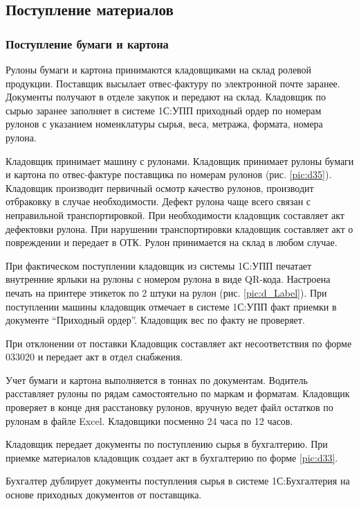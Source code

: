 \newpage
\subsection{Поступление материалов}
\label{bp:MatInput}
%


\subsubsection{Поступление бумаги и картона}

Рулоны бумаги и картона принимаются кладовщиками на склад ролевой продукции. 
Поставщик высылает отвес-фактуру по электронной почте заранее. Документы получают в отделе закупок и передают на склад. Кладовщик по сырью заранее заполняет в системе 1С:УПП приходный ордер по номерам рулонов с указанием номенклатуры сырья, веса, метража, формата, номера рулона.

Кладовщик принимает машину с рулонами. Кладовщик принимает рулоны бумаги и картона по отвес-фактуре поставщика по номерам рулонов (рис. \ref{pic:d35}).  Кладовщик производит первичный осмотр качество рулонов, производит отбраковку в случае необходимости. Дефект рулона чаще всего связан с неправильной транспортировкой.  При необходимости кладовщик составляет акт дефектовки рулона.
При нарушении транспортировки  кладовщик составляет акт о повреждении и передает в ОТК. 
Рулон принимается на склад в любом случае.

При фактическом поступлении кладовщик из системы 1С:УПП печатает внутренние ярлыки на рулоны с номером рулона в виде QR-кода. Настроена печать на принтере этикеток по 2 штуки на рулон (рис. \ref{pic:d_Label}).
При поступлении машины кладовщик отмечает в системе 1С:УПП факт приемки в документе “Приходный ордер”. Кладовщик вес по факту не проверяет.

При отклонении от поставки Кладовщик составляет акт несоответствия по форме 033020 и передает акт в отдел снабжения.

Учет бумаги и картона выполняется в тоннах по документам. 
Водитель расставляет рулоны по рядам самостоятельно по маркам и форматам.
Кладовщик проверяет в конце дня расстановку рулонов, вручную ведет файл остатков по рулонам в файле Excel. 
Кладовщики посменно 24 часа по 12 часов.


Кладовщик передает документы по поступлению сырья в бухгалтерию.
При приемке материалов кладовщик создает акт в бухгалтерию по форме \ref{pic:d33}.

Бухгалтер дублирует документы поступления сырья в системе 1С:Бухгалтерия на основе приходных документов от поставщика.



